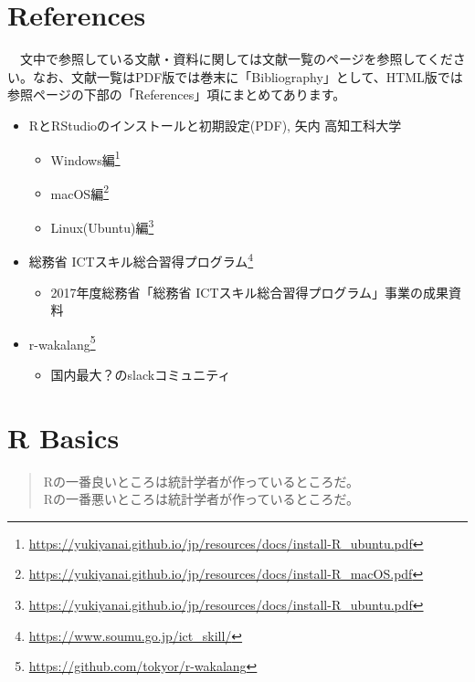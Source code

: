 \documentclass[
  12pt,
]{book}
\DeclareRobustCommand{\href}[2]{#2\footnote{\url{#1}}}
\providecommand{\tightlist}{%
  \setlength{\itemsep}{0pt}\setlength{\parskip}{0pt}}
\begin{document}
\hypertarget{appendix-appendix}{%
\appendix {}}


\hypertarget{references}{%
\chapter{References}\label{references}}

　文中で参照している文献・資料に関しては文献一覧のページを参照してください。なお、文献一覧はPDF版では巻末に「Bibliography」として、HTML版では参照ページの下部の「References」項にまとめてあります。

\begin{itemize}
\tightlist
\item
  RとRStudioのインストールと初期設定(PDF), 矢内 高知工科大学

  \begin{itemize}
  \tightlist
  \item
    \href{https://yukiyanai.github.io/jp/resources/docs/install-R_ubuntu.pdf}{Windows編}
  \item
    \href{https://yukiyanai.github.io/jp/resources/docs/install-R_macOS.pdf}{macOS編}
  \item
    \href{https://yukiyanai.github.io/jp/resources/docs/install-R_ubuntu.pdf}{Linux(Ubuntu)編}
  \end{itemize}
\item
  \href{https://www.soumu.go.jp/ict_skill/}{総務省 ICTスキル総合習得プログラム}

  \begin{itemize}
  \tightlist
  \item
    2017年度総務省「総務省 ICTスキル総合習得プログラム」事業の成果資料
  \end{itemize}
\item
  \href{https://github.com/tokyor/r-wakalang}{r-wakalang}

  \begin{itemize}
  \tightlist
  \item
    国内最大？のslackコミュニティ
  \end{itemize}
\end{itemize}

\hypertarget{Appendix-RBasics}{%
\chapter{R Basics}\label{Appendix-RBasics}}

\begin{quote}
Rの一番良いところは統計学者が作っているところだ。\\
Rの一番悪いところは統計学者が作っているところだ。
\end{quote}
\end{document}
